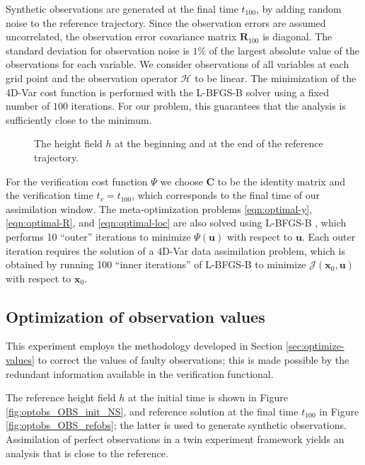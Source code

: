 \documentclass{article}
\newcommand{\C}{\mathbf{C}}
\newcommand{\R}{\mathbf{R}}
\newcommand{\x}{   \mathbf{x} }
\renewcommand{\u}{ \mathbf{u} }
\renewcommand{\H}{\mathcal{H}}
\begin{document}
Synthetic observations are generated at the final time $t_{100}$, by adding random noise to the reference trajectory.
Since the observation errors are assumed uncorrelated, the observation error covariance matrix $\R_{100}$ is diagonal.
The standard deviation for observation noise is $1\%$ of the largest absolute value of the observations for each variable.
We consider observations of all variables at each grid point and the observation operator $\H$ to be linear. 
The minimization of the 4D-Var cost function is performed with the 
L-BFGS-B solver \cite{zhu1997algorithm} using a fixed number of $100$ iterations.
For our problem, this guarantees that the analysis is sufficiently close to the minimum.

\begin{figure}
\centering
{}
\caption{The height field $h$ at the beginning and at the end of the reference trajectory.}
\label{fig:optobs_swetraj}
\end{figure}

For the verification cost function $\Psi$ we choose $\C$ to be the identity matrix and the verification time $t_v = t_{100}$,
which corresponds to the final time of our assimilation window.
The meta-optimization problems \eqref{eqn:optimal-y}, \eqref{eqn:optimal-R}, and \eqref{eqn:optimal-loc} are also solved using
 L-BFGS-B \cite{zhu1997algorithm}, which performs 10 ``outer'' iterations to minimize $\Psi(\u)$ with respect to $\u$. Each outer iteration requires
 the solution of a 4D-Var data assimilation problem, which is obtained by running 100 ``inner iterations''
 of L-BFGS-B to minimize $\mathcal{J}(\x_0,\u)$ with respect to $\x_0$.




\subsection{Optimization of observation values}


This experiment employs the methodology developed in Section \ref{sec:optimize-values} to correct the
values of faulty observations; this is made possible by the redundant information available in the verification functional.

The reference height field $h$ at the initial time is shown in Figure \ref{fig:optobs_OBS_init_NS},
and reference solution at the final time $t_{100}$  in Figure \ref{fig:optobs_OBS_refobs}; the latter is
used to generate synthetic observations.
Assimilation of perfect observations in a twin experiment framework 
yields an analysis that is close to the reference.
\end{document}

